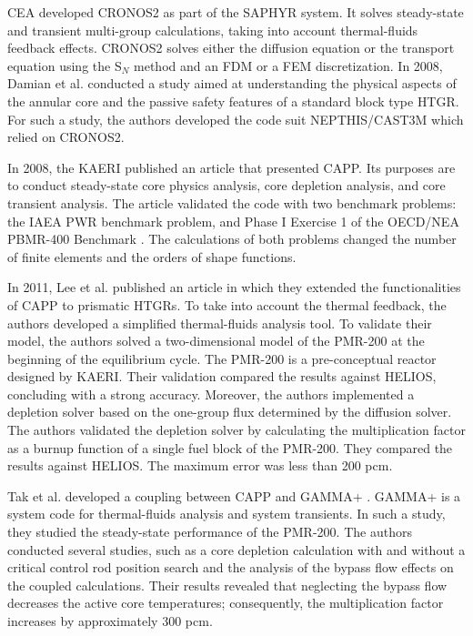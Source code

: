 \gls{CEA} developed CRONOS2 \cite{lautard_cronos_1990} as part of the SAPHYR system.
It solves steady-state and transient multi-group calculations, taking into account thermal-fluids feedback effects.
CRONOS2 solves either the diffusion equation or the transport equation using the S$_N$ method and an \gls{FDM} or a \gls{FEM} discretization.
In 2008, Damian et al. \cite{damian_vhtr_2008} conducted a study aimed at understanding the physical aspects of the annular core and the passive safety features of a standard block type \gls{HTGR}.
For such a study, the authors developed the code suit NEPTHIS/CAST3M which relied on CRONOS2.

In 2008, the \gls{KAERI} published an article \cite{lee_development_2008} that presented CAPP.
Its purposes are to conduct steady-state core physics analysis, core depletion analysis, and core transient analysis.
The article validated the code with two benchmark problems: the IAEA PWR benchmark problem, and Phase I Exercise 1 of the OECD/NEA PBMR-400 Benchmark \cite{reitsma_oecd-neansc_2008}.
The calculations of both problems changed the number of finite elements and the orders of shape functions.

In 2011, Lee et al. published an article \cite{lee_development_2011} in which they extended the functionalities of CAPP to prismatic \glspl{HTGR}.
To take into account the thermal feedback, the authors developed a simplified thermal-fluids analysis tool.
To validate their model, the authors solved a two-dimensional model of the PMR-200 at the beginning of the equilibrium cycle.
The PMR-200 is a pre-conceptual reactor designed by \gls{KAERI}.
Their validation compared the results against HELIOS\cite{stammler_helios_1998}, concluding with a strong accuracy.
Moreover, the authors implemented a depletion solver based on the one-group flux determined by the diffusion solver.
The authors validated the depletion solver by calculating the multiplication factor as a burnup function of a single fuel block of the PMR-200.
They compared the results against HELIOS.
The maximum error was less than 200 pcm.

Tak et al. \cite{tak_cappgamma_2016} developed a coupling between CAPP and GAMMA+ \cite{lim_gamma_2006}.
GAMMA+ is a system code for thermal-fluids analysis and system transients.
In such a study, they studied the steady-state performance of the PMR-200.
The authors conducted several studies, such as a core depletion calculation with and without a critical control rod position search and the analysis of the bypass flow effects on the coupled calculations.
Their results revealed that neglecting the bypass flow decreases the active core temperatures; consequently, the multiplication factor increases by approximately 300 pcm.

